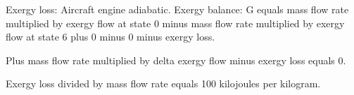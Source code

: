 Exergy loss: Aircraft engine adiabatic.  
Exergy balance:  
G equals mass flow rate multiplied by exergy flow at state 0 minus mass flow rate multiplied by exergy flow at state 6 plus 0 minus 0 minus exergy loss.  

Plus mass flow rate multiplied by delta exergy flow minus exergy loss equals 0.  

Exergy loss divided by mass flow rate equals 100 kilojoules per kilogram.